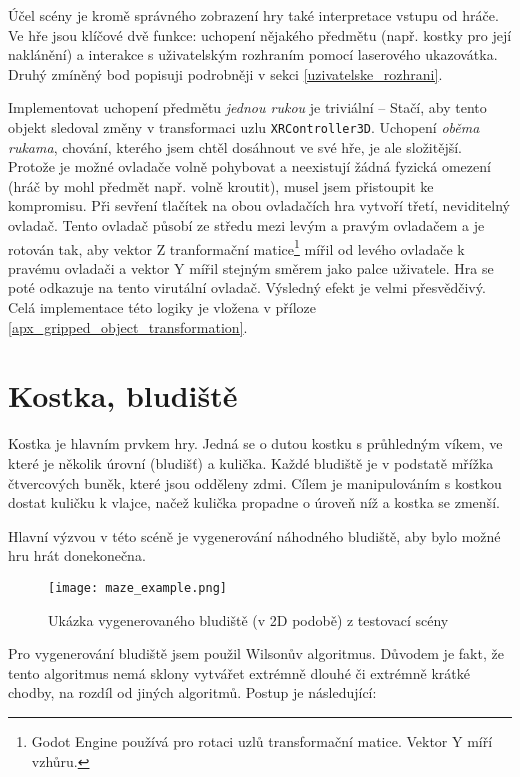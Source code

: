 Účel scény je kromě správného zobrazení hry také interpretace vstupu od hráče. Ve hře jsou klíčové dvě funkce: uchopení nějakého předmětu (např. kostky pro její naklánění) a interakce s uživatelským rozhraním pomocí laserového ukazovátka. Druhý zmíněný bod popisuji podrobněji v sekci \ref{uzivatelske_rozhrani}.

Implementovat uchopení předmětu \textit{jednou rukou} je triviální -- Stačí, aby tento objekt sledoval změny v transformaci uzlu \texttt{XRController3D}. Uchopení \textit{oběma rukama}, chování, kterého jsem chtěl dosáhnout ve své hře, je ale složitější. Protože je možné ovladače volně pohybovat a neexistují žádná fyzická omezení (hráč by mohl předmět např. volně kroutit), musel jsem přistoupit ke kompromisu. Při sevření tlačítek na obou ovladačích hra vytvoří třetí, neviditelný ovladač. Tento ovladač působí ze středu mezi levým a pravým ovladačem a je rotován tak, aby vektor Z tranformační matice\footnote{Godot Engine používá pro rotaci uzlů transformační matice. Vektor Y míří vzhůru.} mířil od levého ovladače k pravému ovladači a vektor Y mířil stejným směrem jako palce uživatele. Hra se poté odkazuje na tento virutální ovladač. Výsledný efekt je velmi přesvědčivý. Celá implementace této logiky je vložena v příloze \ref{apx_gripped_object_transformation}.

\section{Kostka, bludiště}

Kostka je hlavním prvkem hry. Jedná se o dutou kostku s průhledným víkem, ve které je několik úrovní (bludišť) a kulička. Každé bludiště je v podstatě mřížka čtvercových buněk, které jsou odděleny zdmi. Cílem je manipulováním s kostkou dostat kuličku k vlajce, načež kulička propadne o úroveň níž a kostka se zmenší.

Hlavní výzvou v této scéně je vygenerování náhodného bludiště, aby bylo možné hru hrát donekonečna.

\begin{figure}[H]
  \centering
  \texttt{[image: maze\_example.png]}
  \caption{Ukázka vygenerovaného bludiště (v 2D podobě) z testovací scény}
  \label{maze_example}
\end{figure}

Pro vygenerování bludiště jsem použil Wilsonův algoritmus. Důvodem je fakt, že tento algoritmus nemá sklony vytvářet extrémně dlouhé či extrémně krátké chodby, na rozdíl od jiných algoritmů. Postup je následující: \cite{enwiki:1193338583}

